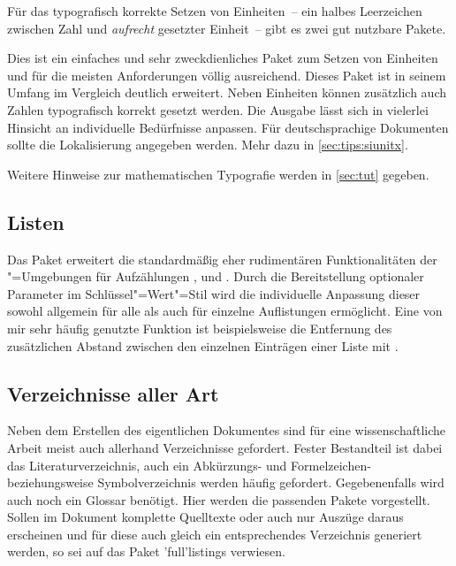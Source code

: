Für das typografisch korrekte Setzen von Einheiten~-- ein halbes Leerzeichen 
zwischen Zahl und \emph{aufrecht} gesetzter Einheit~-- gibt es zwei gut 
nutzbare Pakete.

\begin{DeclarePackages}
%
  Dies ist ein einfaches und sehr zweckdienliches Paket zum Setzen von 
  Einheiten und für die meisten Anforderungen völlig ausreichend.
  Dieses Paket ist in seinem Umfang im Vergleich deutlich erweitert. Neben 
  Einheiten können zusätzlich auch Zahlen typografisch korrekt gesetzt werden. 
  Die Ausgabe lässt sich in vielerlei Hinsicht an individuelle Bedürfnisse 
  anpassen. Für deutschsprachige Dokumenten sollte die Lokalisierung angegeben 
  werden. Mehr dazu in \autoref{sec:tips:siunitx}.
%
\end{DeclarePackages}

Weitere Hinweise zur mathematischen Typografie werden in \autoref{sec:tut} 
gegeben.%
%



\subsection{Listen}
%
\begin{DeclarePackages}
  Das Paket  erweitert die standardmäßig eher rudimentären 
  Funktionalitäten der "=Umgebungen für Aufzählungen 
  ,  und .
  Durch die Bereitstellung optionaler Parameter im Schlüssel"=Wert"=Stil wird 
  die individuelle Anpassung dieser sowohl allgemein für alle als auch für 
  einzelne Auflistungen ermöglicht. Eine von mir sehr häufig genutzte Funktion 
  ist beispielsweise die Entfernung des zusätzlichen Abstand zwischen den 
  einzelnen Einträgen einer Liste mit .
\end{DeclarePackages}



\subsection{%
  Verzeichnisse aller Art%
}
%
Neben dem Erstellen des eigentlichen Dokumentes sind für eine wissenschaftliche 
Arbeit meist auch allerhand Verzeichnisse gefordert. Fester Bestandteil ist 
dabei das Literaturverzeichnis, auch ein Abkürzungs- und Formelzeichen- 
beziehungsweise Symbolverzeichnis werden häufig gefordert. Gegebenenfalls wird 
auch noch ein Glossar benötigt. Hier werden die passenden Pakete vorgestellt. 
Sollen im Dokument komplette Quelltexte oder auch nur Auszüge daraus erscheinen 
und für diese auch gleich ein entsprechendes Verzeichnis generiert werden, so 
sei auf das Paket \Package'full'{listings} verwiesen.

